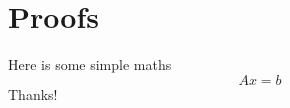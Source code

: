 \chapter{Proofs}

Here is some simple maths
\begin{equation}
Ax = b
\end{equation}
Thanks! \cite{Avron-FasterRandomizedInfeasibleIPMs}